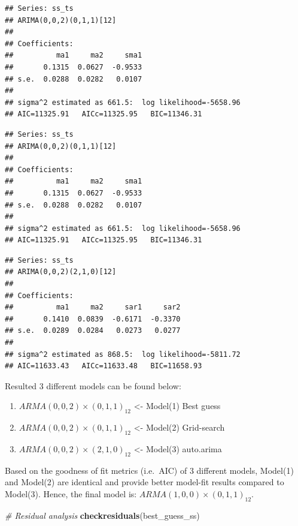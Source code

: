 \documentclass[
  11pt,
]{article}
\newenvironment{Shaded}{\begin{snugshade}}{\end{snugshade}}
\newcommand{\CommentTok}[1]{\textcolor[rgb]{0.56,0.35,0.01}{\textit{#1}}}
\newcommand{\KeywordTok}[1]{\textcolor[rgb]{0.13,0.29,0.53}{\textbf{#1}}}
\newcommand{\NormalTok}[1]{#1}
\providecommand{\tightlist}{%
  \setlength{\itemsep}{0pt}\setlength{\parskip}{0pt}}
\begin{document}
\begin{verbatim}
## Series: ss_ts 
## ARIMA(0,0,2)(0,1,1)[12] 
## 
## Coefficients:
##          ma1     ma2     sma1
##       0.1315  0.0627  -0.9533
## s.e.  0.0288  0.0282   0.0107
## 
## sigma^2 estimated as 661.5:  log likelihood=-5658.96
## AIC=11325.91   AICc=11325.95   BIC=11346.31
\end{verbatim}

\begin{verbatim}
## Series: ss_ts 
## ARIMA(0,0,2)(0,1,1)[12] 
## 
## Coefficients:
##          ma1     ma2     sma1
##       0.1315  0.0627  -0.9533
## s.e.  0.0288  0.0282   0.0107
## 
## sigma^2 estimated as 661.5:  log likelihood=-5658.96
## AIC=11325.91   AICc=11325.95   BIC=11346.31
\end{verbatim}

\begin{verbatim}
## Series: ss_ts 
## ARIMA(0,0,2)(2,1,0)[12] 
## 
## Coefficients:
##          ma1     ma2     sar1     sar2
##       0.1410  0.0839  -0.6171  -0.3370
## s.e.  0.0289  0.0284   0.0273   0.0277
## 
## sigma^2 estimated as 868.5:  log likelihood=-5811.72
## AIC=11633.43   AICc=11633.48   BIC=11658.93
\end{verbatim}

Resulted 3 different models can be found below:

\begin{enumerate}
\def\labelenumi{\arabic{enumi}.}
\tightlist
\item
  \(ARMA(0,0,2)\times(0,1,1)_{12}\) \textless- Model(1) Best guess
\item
  \(ARMA(0,0,2)\times(0,1,1)_{12}\) \textless- Model(2) Grid-search
\item
  \(ARMA(0,0,2)\times(2,1,0)_{12}\) \textless- Model(3) auto.arima
\end{enumerate}

Based on the goodness of fit metrics (i.e.~AIC) of 3 different models,
Model(1) and Model(2) are identical and provide better model-fit results
compared to Model(3). Hence, the final model is:
\(ARMA(1,0,0)\times(0,1,1)_{12}\).

\begin{Shaded}
\begin{Highlighting}[]
\CommentTok{# Residual analysis}
\KeywordTok{checkresiduals}\NormalTok{(best_guess_ss)}
\end{Highlighting}
\end{Shaded}
\end{document}

